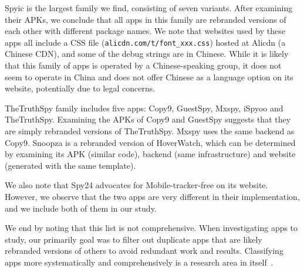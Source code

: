 Spyic is the largest family we find, consisting of seven variants.
After examining their APKs, we conclude that all apps in this family
are rebranded versions of each other with different package names.  We
note that websites used by these apps all include a CSS file
(\texttt{alicdn.com/t/font\_xxx.css}) hosted at Alicdn (a Chinese
CDN), and some of the debug strings are in Chinese.
While it is likely that this family of apps is operated
by a Chinese-speaking group, it does not seem to operate in China and
does not offer Chinese as a language option on its website,
potentially due to legal concerns.

TheTruthSpy family includes five apps: Copy9, GuestSpy, Mxspy, iSpyoo
and TheTruthSpy. Examining the APKs of Copy9 and GuestSpy suggests that
they are simply rebranded versions of TheTruthSpy. Mxspy uses the same
backend as Copy9.  Snoopza is a rebranded version of HoverWatch, which
can be determined by examining its APK (similar code), backend (same
infrastructure) and website (generated with the same
template).

We also note that Spy24 advocates for Mobile-tracker-free on its
website. However, we observe that the two apps are very different in
their implementation, and we include both of them in our study.

We end by noting that this list is not comprehensive.  When investigating apps
to study, our primarily goal was to filter out duplicate apps that are
likely rebranded versions of others to avoid redundant work and
results.  Classifying apps more systematically and comprehensively is
a research area in itself~\cite{SuarezTangil2013Dendroid,
Zhang2014Semantics, deshotels2014droidlegacy, pierazzi2020data}.


\newcommand{\hash}[1]{\texttt{#1}}

